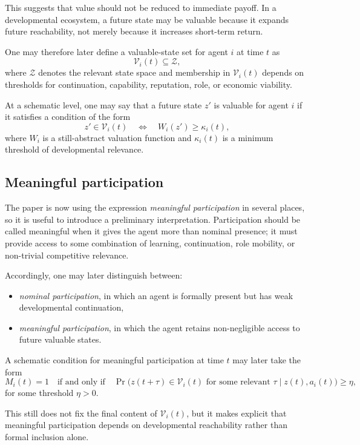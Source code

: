 \documentclass[11pt]{article}
\begin{document}
This suggests that value should not be reduced to immediate payoff. In a developmental ecosystem, a future state may be valuable because it expands future reachability, not merely because it increases short-term return.

One may therefore later define a valuable-state set for agent \(i\) at time \(t\) as
\[
\mathcal{V}_i(t) \subseteq \mathcal{Z},
\]
where \(\mathcal{Z}\) denotes the relevant state space and membership in \(\mathcal{V}_i(t)\) depends on thresholds for continuation, capability, reputation, role, or economic viability.

At a schematic level, one may say that a future state \(z'\) is valuable for agent \(i\) if it satisfies a condition of the form
\[
z' \in \mathcal{V}_i(t)
\quad \Longleftrightarrow \quad
W_i(z') \geq \kappa_i(t),
\]
where \(W_i\) is a still-abstract valuation function and \(\kappa_i(t)\) is a minimum threshold of developmental relevance.

\subsection{Meaningful participation}

The paper is now using the expression \emph{meaningful participation} in several places, so it is useful to introduce a preliminary interpretation. Participation should be called meaningful when it gives the agent more than nominal presence; it must provide access to some combination of learning, continuation, role mobility, or non-trivial competitive relevance.

Accordingly, one may later distinguish between:
\begin{itemize}
  \item \emph{nominal participation}, in which an agent is formally present but has weak developmental continuation,
  \item \emph{meaningful participation}, in which the agent retains non-negligible access to future valuable states.
\end{itemize}

A schematic condition for meaningful participation at time \(t\) may later take the form
\[
M_i(t) = 1
\quad \text{if and only if} \quad
\Pr\big(z(t+\tau) \in \mathcal{V}_i(t) \text{ for some relevant } \tau \mid z(t), a_i(t)\big) \geq \eta,
\]
for some threshold \(\eta > 0\).

This still does not fix the final content of \(\mathcal{V}_i(t)\), but it makes explicit that meaningful participation depends on developmental reachability rather than formal inclusion alone.
\end{document}
